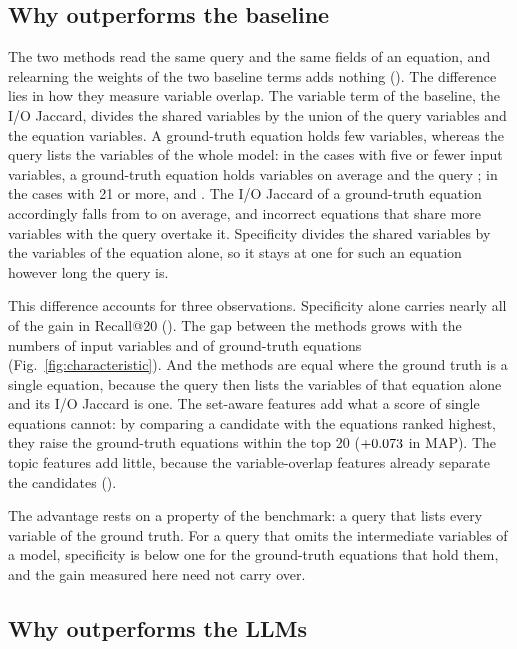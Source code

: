 \subsection{Why \ours{} outperforms the baseline}\label{sec:whybase}

The two methods read the same query and the same fields of an equation, and relearning the weights
of the two baseline terms adds nothing (). The difference lies in how
they measure variable overlap. The variable term of the baseline, the I/O Jaccard, divides the
shared variables by the union of the query variables and the equation variables. A ground-truth
equation holds few variables, whereas the query lists the variables of the whole model: in the
cases with five or fewer input variables, a ground-truth equation holds \VarsGtInLow{} variables on
average and the query \QueryVarsInLow; in the cases with 21 or more, \VarsGtInHigh{} and
\QueryVarsInHigh. The I/O Jaccard of a ground-truth equation accordingly falls from \JacGtInLow{}
to \JacGtInHigh{} on average, and incorrect equations that share more variables with the query
overtake it. Specificity divides the shared variables by the variables of the equation alone, so it
stays at one for such an equation however long the query is.

This difference accounts for three observations. Specificity alone carries nearly all of the gain
in Recall@20 (). The gap between the methods grows with the numbers of
input variables and of ground-truth equations (Fig.~\ref{fig:characteristic}). And the methods are
equal where the ground truth is a single equation, because the query then lists the variables of
that equation alone and its I/O Jaccard is one. The set-aware features add what a score of single
equations cannot: by comparing a candidate with the equations ranked highest, they raise the
ground-truth equations within the top 20 ($+0.073$ in MAP). The topic features add
little, because the variable-overlap features already separate the candidates
().

The advantage rests on a property of the benchmark: a query that lists every variable of the
ground truth. For a query that omits the intermediate variables of a model, specificity is below
one for the ground-truth equations that hold them, and the gain measured here need not carry over.

\subsection{Why \ours{} outperforms the LLMs}\label{sec:strengths}

